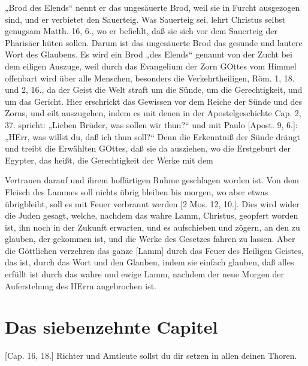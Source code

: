 „Brod des Elends“ nennt er das ungesäuerte Brod, weil sie in Furcht ausgezogen sind, und er verbietet den Sauerteig. Was Sauerteig sei, lehrt Christus selbst genugsam Matth. 16, 6., wo er befiehlt, daß sie sich vor dem Sauerteig der Pharisäer hüten sollen. Darum ist das ungesäuerte Brod das gesunde und lautere Wort
des Glaubens. Es wird ein Brod „des Elends“ genannt von der Zucht bei dem eiligen Auszuge, weil durch das Evangelium der Zorn GOttes vom Himmel offenbart wird über alle Menschen, besonders die Verkehrtheiligen, Röm. 1, 18. und 2, 16., da der Geist die Welt straft um die Sünde, um die Gerechtigkeit, und um das Gericht. Hier erschrickt das Gewissen vor dem Reiche der Sünde und des Zorns, und eilt auszugehen, indem es mit denen in der Apostelgeschichte Cap. 2, 37. spricht: „Lieben Brüder, was sollen wir thun?“ und mit Paulo [Apost. 9, 6.]: „HErr, was willst du, daß ich thun soll?“ Denn die Erkenntniß der Sünde drängt und treibt die Erwählten GOttes, daß sie da ausziehen, wo die Erstgeburt der Egypter, das heißt, die Gerechtigkeit der Werke mit dem

Vertrauen darauf und ihrem hoffärtigen Ruhme geschlagen worden ist. Von dem Fleisch des Lammes soll nichts übrig bleiben bis morgen, wo aber etwas übrigbleibt, soll es mit Feuer verbrannt werden [2 Mos. 12, 10.]. Dies wird wider die Juden gesagt, welche, nachdem das wahre Lamm, Christus, geopfert worden ist, ihn noch in der Zukunft erwarten, und es aufschieben und zögern, an den zu glauben, der gekommen ist, und die Werke des Gesetzes fahren zu lassen. Aber die Göttlichen verzehren das ganze [Lamm] durch das Feuer des Heiligen Geistes, das ist, durch das Wort und den Glauben, indem sie einfach glauben, daß alles erfüllt ist durch das wahre und ewige Lamm, nachdem der neue Morgen der Auferstehung des HErrn angebrochen ist.

\section{Das siebenzehnte Capitel}

[Cap. 16, 18.] Richter und Amtleute sollst du dir setzen in allen deinen Thoren.

